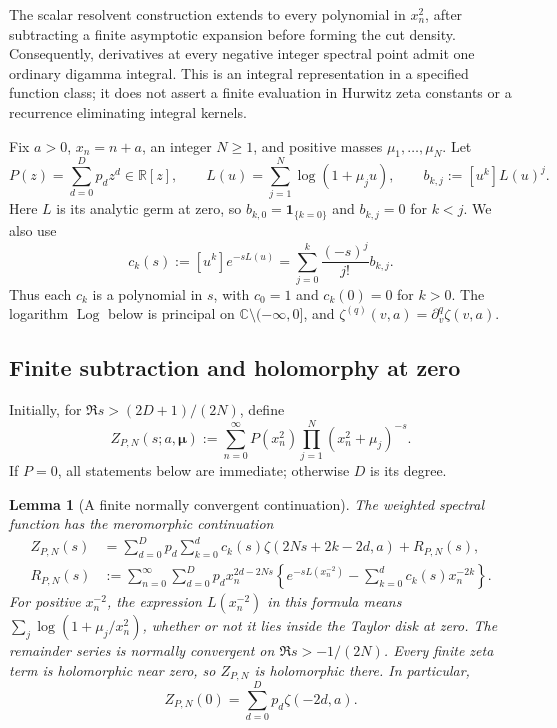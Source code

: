 \documentclass[11pt,letterpaper]{article}
\numberwithin{equation}{section}
\newtheorem{lemma}[theorem]{Lemma}
\theoremstyle{definition}
\theoremstyle{remark}
\DeclareMathOperator{\Log}{Log}
\begin{document}
The scalar resolvent construction extends to every polynomial in
$x_n^2$, after subtracting a finite asymptotic expansion before
forming the cut density.  Consequently, derivatives at every
negative integer spectral point admit one ordinary digamma
integral.  This is an integral representation in a specified
function class; it does not assert a finite evaluation in
Hurwitz zeta constants or a recurrence eliminating integral
kernels.

Fix $a>0$, $x_n=n+a$, an integer $N\geq1$, and positive masses
$\mu_1,\ldots,\mu_N$.  Let
\[
 P(z)=\sum_{d=0}^{D}p_dz^d\in\mathbb R[z],\qquad
 L(u)=\sum_{j=1}^{N}\log(1+\mu_j u),\qquad
 b_{k,j}:=[u^k]L(u)^j.
\]
Here $L$ is its analytic germ at zero, so
$b_{k,0}=\boldsymbol1_{\{k=0\}}$ and $b_{k,j}=0$ for $k<j$.
We also use
\[
 c_k(s):=[u^k]e^{-sL(u)}
   =\sum_{j=0}^{k}\frac{(-s)^j}{j!}b_{k,j}.
\]
Thus each $c_k$ is a polynomial in $s$, with $c_0=1$ and
$c_k(0)=0$ for $k>0$.  The logarithm $\Log$ below is principal
on $\mathbb C\setminus(-\infty,0]$, and
$\zeta^{(q)}(v,a)=\partial_v^q\zeta(v,a)$.


\subsection{Finite subtraction and holomorphy at zero}
\label{ng:continuation-subsection}

Initially, for $\Re s>(2D+1)/(2N)$, define
\begin{equation}
 Z_{P,N}(s;a,\boldsymbol\mu)
 :=\sum_{n=0}^{\infty}P(x_n^2)
                 \prod_{j=1}^{N}(x_n^2+\mu_j)^{-s}.
 \label{ng:weighted-definition}
\end{equation}
If $P=0$, all statements below are immediate; otherwise $D$
is its degree.

\begin{lemma}[A finite normally convergent continuation]
\label{ng:finite-continuation}
The weighted spectral function has the meromorphic continuation
\begin{align}
 Z_{P,N}(s)
 &=\sum_{d=0}^{D}p_d\sum_{k=0}^{d}
       c_k(s)\zeta(2Ns+2k-2d,a)+R_{P,N}(s),
 \label{ng:continuation}\\
 R_{P,N}(s)
 &:=\sum_{n=0}^{\infty}\sum_{d=0}^{D}p_d x_n^{2d-2Ns}
       \left\{e^{-sL(x_n^{-2})}
                 -\sum_{k=0}^{d}c_k(s)x_n^{-2k}\right\}.
 \label{ng:normal-remainder}
\end{align}
For positive $x_n^{-2}$, the expression $L(x_n^{-2})$ in this
formula means $\sum_j\log(1+\mu_j/x_n^2)$, whether or not it
lies inside the Taylor disk at zero.
The remainder series is normally convergent on
$\Re s>-1/(2N)$.  Every finite zeta term is holomorphic near
zero, so $Z_{P,N}$ is holomorphic there.  In particular,
\begin{equation}
 Z_{P,N}(0)=\sum_{d=0}^{D}p_d\zeta(-2d,a).
 \label{ng:zeroth-jet}
\end{equation}
\end{lemma}
\end{document}

